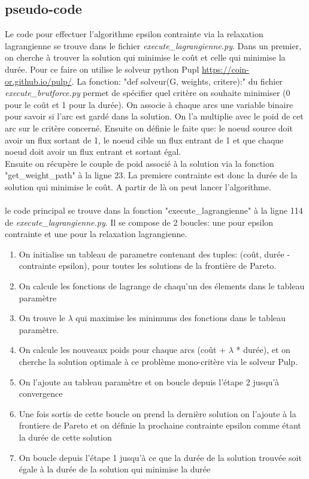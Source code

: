 \documentclass[]{article}
\begin{document}
        \subsection{pseudo-code}
        
        Le code pour effectuer l'algorithme epsilon contrainte via la relaxation
        lagrangienne se trouve dans le fichier \textit{execute\_lagrangienne.py}.
        Dans un premier, on cherche à trouver la solution qui minimise le coût et
        celle qui minimise la durée. Pour ce faire on utilise le solveur python
        Pupl \url{https://coin-or.github.io/pulp/}. La fonction: "def solveur(G, weights, critere):"
        du fichier \textit{execute\_brutforce.py} permet de spécifier quel critère on 
        souhaite minimiser (0 pour le coût et 1 pour la durée). On associe à chaque arcs
        une variable binaire pour savoir si l'arc est gardé dans la solution. On l'a
        multiplie avec le poid de cet arc sur le critère concerné. Ensuite on définie le 
        faite que: le noeud source doit avoir un flux sortant de 1, le noeud cible un flux
        entrant de 1 et que chaque noeud doit avoir un flux entrant et sortant égal.\\
        Ensuite on récupère le couple de poid associé à la solution via la fonction
        "get\_weight\_path" à la ligne 23. La premiere contrainte est donc la durée de
        la solution qui minimise le coût. A partir de là on peut lancer l'algorithme.\\
        \\
        le code principal se trouve dans la fonction "execute\_lagrangienne" à la ligne
        114 de \textit{execute\_lagrangienne.py}. Il se compose de 2 boucles: une pour 
        epsilon contrainte et une pour la relaxation lagrangienne.\\
        
        \begin{enumerate}
            \item On initialise un tableau de parametre contenant des tuples: (coût, durée - contrainte epsilon), pour toutes les solutions de la frontière de Pareto.
            \item On calcule les fonctions de lagrange de chaqu'un des élements dans le tableau paramètre
            \item On trouve le $\lambda$ qui maximise les minimums des fonctions dans le tableau paramètre.
            \item On calcule les nouveaux poids pour chaque arcs (coût + $\lambda$ * durée), et on cherche la solution optimale à ce problème mono-critère via le solveur Pulp.
            \item On l'ajoute au tableau paramètre et on boucle depuis l'étape 2 jusqu'à convergence
            \item Une fois sortis de cette boucle on prend la dernière solution on l'ajoute à la frontiere de Pareto et on définie la prochaine contrainte epsilon comme étant la durée de cette solution
            \item On boucle depuis l'étape 1 jusqu'à ce que la durée de la solution trouvée soit égale à la durée de la solution qui minimise la durée 
        \end{enumerate}
\end{document}
